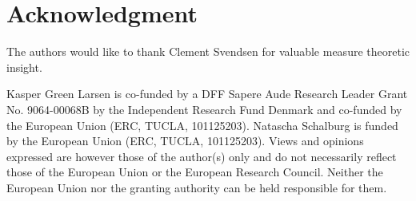 \section*{Acknowledgment}
The authors would like to thank Clement Svendsen for valuable measure theoretic insight. 

Kasper Green Larsen is co-funded by a DFF Sapere Aude Research Leader Grant No. 9064-00068B by the Independent Research Fund Denmark and co-funded by the European Union (ERC, TUCLA, 101125203). Natascha Schalburg is funded by the European Union (ERC, TUCLA, 101125203). Views and opinions expressed are however those of the author(s) only and do not necessarily reflect those of the European Union or the European Research Council. Neither the European Union nor the granting authority can be held responsible for them.